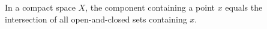 In a compact space $X$, the component containing a point $x$ equals the intersection of all open-and-closed sets containing $x$.
